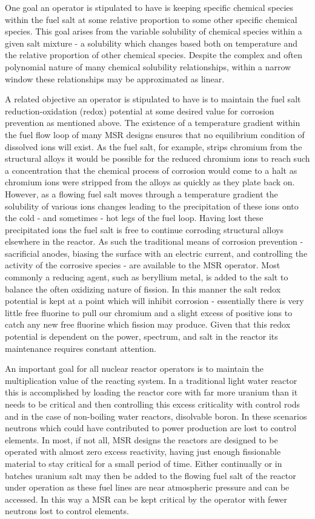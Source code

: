 One goal an operator is stipulated to have is keeping specific chemical
species within the fuel salt at some relative proportion to some other
specific chemical species. This goal arises from the variable solubility of
chemical species within a given salt mixture - a solubility which changes
based both on temperature and the relative proportion of other chemical species.
Despite the complex and often polynomial nature of many chemical solubility
relationships, within a narrow window these relationships may be approximated
as linear.

A related objective an operator is stipulated to have is to maintain the fuel
salt reduction-oxidation (redox) potential at some desired value for corrosion
prevention as mentioned above. The existence of a temperature gradient within
the fuel flow loop of many MSR designs ensures that no equilibrium condition of
dissolved ions will exist. As the fuel salt, for example, strips chromium from
the structural alloys it would be possible for the reduced chromium ions to
reach such a concentration that the chemical process of corrosion would come to
a halt as chromium ions were stripped from the alloys as quickly as they
plate back on. However, as a flowing fuel salt moves through a temperature
gradient the solubility of various ions changes leading to the precipitation of
these ions onto the cold - and sometimes - hot legs of the fuel loop. Having
lost these precipitated ions the fuel salt is free to continue corroding
structural alloys elsewhere in the reactor. As such the traditional means of 
corrosion prevention - sacrificial anodes, biasing the surface with an electric
current, and controlling the activity of the corrosive species - are available
to the MSR operator. Most commonly a reducing agent, such as beryllium metal,
is added to the salt to balance the often oxidizing nature of fission. In
this manner the salt redox potential is kept at a point which will inhibit
corrosion - essentially there is very little free fluorine to pull our chromium
and a slight excess of positive ions to catch any new free fluorine which
fission may produce. Given that this redox potential is dependent on the power,
spectrum, and salt in the reactor its maintenance requires constant attention.

An important goal for all nuclear reactor
operators is to maintain the multiplication value of the reacting system. In a
traditional light water reactor this is accomplished by loading the reactor
core with far more uranium than it needs to be critical and then controlling
this excess criticality with control rods and in the case of non-boiling water
reactors, disolvable boron. In these scenarios neutrons which could have
contributed to power production are lost to control elements. In most, if not
all, MSR designs the reactors are designed to be operated with almost zero
excess reactivity, having just enough fissionable material to stay critical for
a small period of time. Either continually or in batches uranium salt may then
be added to the flowing fuel salt of the reactor under operation as these fuel
lines are near atmospheric pressure and can be accessed. In this way a MSR can
be kept critical by the operator with fewer neutrons lost to control elements.

